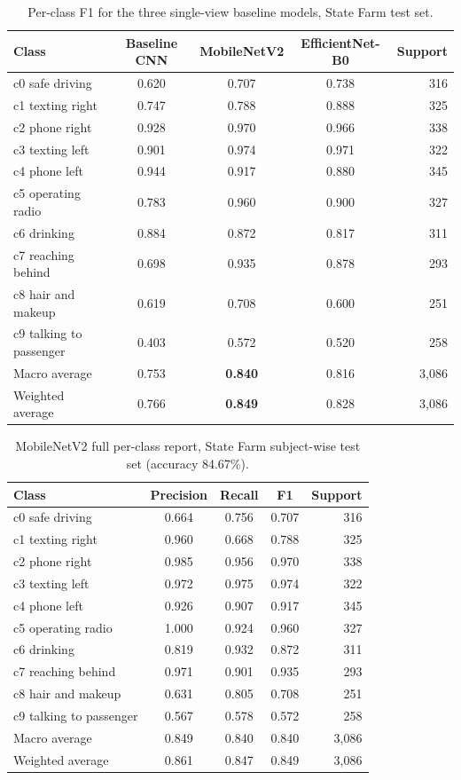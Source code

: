 \begin{table}[H]
\centering
\caption{Per-class F1 for the three single-view baseline models, State Farm test set.}
\label{tab:app-sf-f1}
\small
\begin{tabular}{lcccr}
\toprule
\textbf{Class} & \textbf{Baseline CNN} & \textbf{MobileNetV2} & \textbf{EfficientNet-B0} & \textbf{Support} \\
\midrule
c0 safe driving & 0.620 & 0.707 & 0.738 & 316 \\
c1 texting right & 0.747 & 0.788 & 0.888 & 325 \\
c2 phone right & 0.928 & 0.970 & 0.966 & 338 \\
c3 texting left & 0.901 & 0.974 & 0.971 & 322 \\
c4 phone left & 0.944 & 0.917 & 0.880 & 345 \\
c5 operating radio & 0.783 & 0.960 & 0.900 & 327 \\
c6 drinking & 0.884 & 0.872 & 0.817 & 311 \\
c7 reaching behind & 0.698 & 0.935 & 0.878 & 293 \\
c8 hair and makeup & 0.619 & 0.708 & 0.600 & 251 \\
c9 talking to passenger & 0.403 & 0.572 & 0.520 & 258 \\
\midrule
Macro average & 0.753 & \textbf{0.840} & 0.816 & 3{,}086 \\
Weighted average & 0.766 & \textbf{0.849} & 0.828 & 3{,}086 \\
\bottomrule
\end{tabular}
\end{table}

\begin{table}[H]
\centering
\caption{MobileNetV2 full per-class report, State Farm subject-wise test set (accuracy 84.67\%).}
\label{tab:app-mnv2}
\small
\begin{tabular}{lcccr}
\toprule
\textbf{Class} & \textbf{Precision} & \textbf{Recall} & \textbf{F1} & \textbf{Support} \\
\midrule
c0 safe driving & 0.664 & 0.756 & 0.707 & 316 \\
c1 texting right & 0.960 & 0.668 & 0.788 & 325 \\
c2 phone right & 0.985 & 0.956 & 0.970 & 338 \\
c3 texting left & 0.972 & 0.975 & 0.974 & 322 \\
c4 phone left & 0.926 & 0.907 & 0.917 & 345 \\
c5 operating radio & 1.000 & 0.924 & 0.960 & 327 \\
c6 drinking & 0.819 & 0.932 & 0.872 & 311 \\
c7 reaching behind & 0.971 & 0.901 & 0.935 & 293 \\
c8 hair and makeup & 0.631 & 0.805 & 0.708 & 251 \\
c9 talking to passenger & 0.567 & 0.578 & 0.572 & 258 \\
\midrule
Macro average & 0.849 & 0.840 & 0.840 & 3{,}086 \\
Weighted average & 0.861 & 0.847 & 0.849 & 3{,}086 \\
\bottomrule
\end{tabular}
\end{table}

